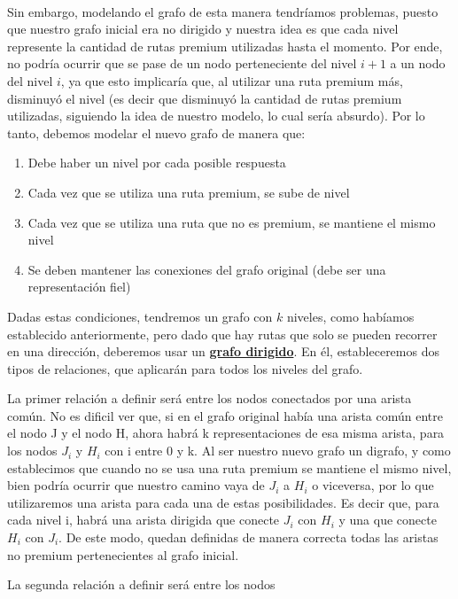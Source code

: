 \\
\par
Sin embargo, modelando el grafo de esta manera tendríamos problemas, puesto que nuestro grafo inicial era no dirigido y nuestra idea es que cada nivel represente la cantidad de rutas premium utilizadas hasta el momento. Por ende, no podría ocurrir que se pase de un nodo perteneciente del nivel $i+1$ a un nodo del nivel $i$, ya que esto implicaría que, al utilizar una ruta premium más, disminuyó el nivel (es decir que disminuyó la cantidad de rutas premium utilizadas, siguiendo la idea de nuestro modelo, lo cual sería absurdo). Por lo tanto, debemos modelar el nuevo grafo de manera que:
\begin{enumerate}
\item Debe haber un nivel por cada posible respuesta
\item Cada vez que se utiliza una ruta premium, se sube de nivel
\item Cada vez que se utiliza una ruta que no es premium, se mantiene el mismo nivel
\item Se deben mantener las conexiones del grafo original (debe ser una representación fiel)
\end{enumerate}

Dadas estas condiciones, tendremos un grafo con $k$ niveles, como habíamos establecido anteriormente, pero dado que hay rutas que solo se pueden recorrer en una dirección, deberemos usar un \underline{\textbf{grafo dirigido}}. En él, estableceremos dos tipos de relaciones, que aplicarán para todos los niveles del grafo.
\\
\par
La primer relación a definir será entre los nodos conectados por una arista común. No es dificil ver que, si en el grafo original había una arista común entre el nodo J y el nodo H, ahora habrá k representaciones de esa misma arista, para los nodos $J_i$ y $H_i$ con i entre 0 y k. Al ser nuestro nuevo grafo un digrafo, y como establecimos que cuando no se usa una ruta premium se mantiene el mismo nivel, bien podría ocurrir que nuestro camino vaya de $J_i$ a $H_i$ o viceversa, por lo que utilizaremos una arista para cada una de estas posibilidades. Es decir que, para cada nivel i, habrá una arista dirigida que conecte $J_i$ con $H_i$ y una que conecte $H_i$ con $J_i$. De este modo, quedan definidas de manera correcta todas las aristas no premium pertenecientes al grafo inicial.
\\
\par
La segunda relación a definir será entre los nodos 


